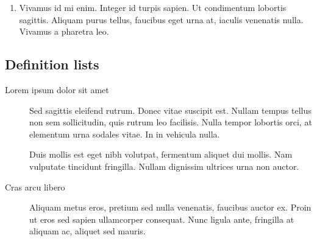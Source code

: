 \documentclass[letterpaper,10pt,english]{sphinxmanual}
\begin{document}
\begin{enumerate}
\begin{enumerate}
%
\begin{sphinxVerbatim}[commandchars=\\\{\}]
    
           
       \PYG{p}{[}\PYG{p}{]}
         
      \PYG{p}{[}\PYG{p}{]}  \PYG{p}{[}\PYG{p}{]}
   
\end{sphinxVerbatim}
\sphinxresetverbatimhllines

\end{enumerate}

\item {} 
Vivamus id mi enim. Integer id turpis sapien. Ut condimentum lobortis
sagittis. Aliquam purus tellus, faucibus eget urna at, iaculis
venenatis nulla. Vivamus a pharetra leo.

\end{enumerate}


\subsection{Definition lists}
\label{\detokenize{specimen:definition-lists}}\begin{description}
\item[{Lorem ipsum dolor sit amet}] \leavevmode
Sed sagittis eleifend rutrum. Donec vitae suscipit est. Nullam tempus
tellus non sem sollicitudin, quis rutrum leo facilisis. Nulla tempor
lobortis orci, at elementum urna sodales vitae. In in vehicula nulla.

Duis mollis est eget nibh volutpat, fermentum aliquet dui mollis. Nam
vulputate tincidunt fringilla. Nullam dignissim ultrices urna non
auctor.

\item[{Cras arcu libero}] \leavevmode
Aliquam metus eros, pretium sed nulla venenatis, faucibus auctor ex.
Proin ut eros sed sapien ullamcorper consequat. Nunc ligula ante,
fringilla at aliquam ac, aliquet sed mauris.

\end{description}
\end{document}
